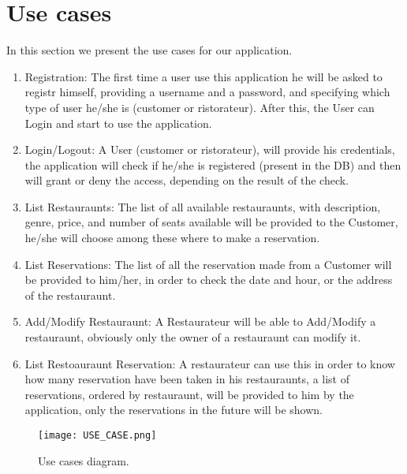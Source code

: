 \section{Use cases}
	In this section we present the use cases for our application.
	\begin{enumerate}
		\item Registration: The first time a user use this application he will be asked to registr himself, providing a username and a password, and specifying which type of user he/she is (customer or ristorateur).
		After this, the User can Login and start to use the application.
		\item Login/Logout: A User (customer or ristorateur), will provide his credentials, the application will check if he/she is registered (present in the DB) and then will grant or deny the access, depending on the result of the check.
		\item List Restauraunts: The list of all available restauraunts, with description, genre, price, and number of seats available will be provided to the Customer, he/she will choose among these where to make a reservation.
		\item List Reservations: The list of all the reservation made from a Customer will be provided to him/her, in order to check the date and hour, or the address of the restauraunt.
		\item Add/Modify Restauraunt: A Restaurateur will be able to Add/Modify a restauraunt, obviously only the owner of a restauraunt can modify it.
		\item List Restoauraunt Reservation: A restaurateur can use this in order to know how many reservation have been taken in his restauraunts, a list of reservations, ordered by restauraunt, will be provided to him by the application, only the reservations in the future will be shown.
	\end{enumerate}

\begin{figure}
  \texttt{[image: USE\_CASE.png]}
  \caption{Use cases diagram.}
  \label{figureUSE_CASE}
\end{figure}

\pagebreak